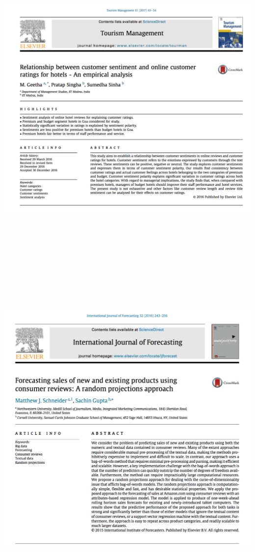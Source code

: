 \includegraphics[width=7.60417in,height=6.45833in]{hotel.png}

\includegraphics[width=7.29167in,height=6.77083in]{sales1.png}

